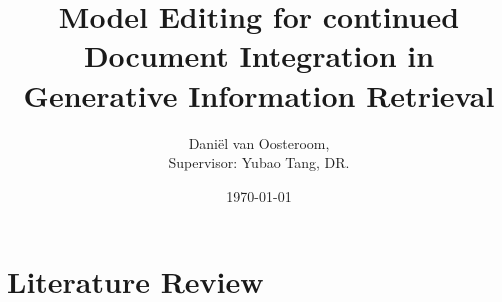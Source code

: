 \documentclass{article}
\title{Model Editing for continued Document Integration in Generative Information Retrieval}
\author{Daniël van Oosteroom, \\
  \small Supervisor: Yubao Tang, DR. 
}
\date{\today}
\begin{document}
\maketitle

\section{Literature Review}


\section{}

\printbibliography
\end{document}
